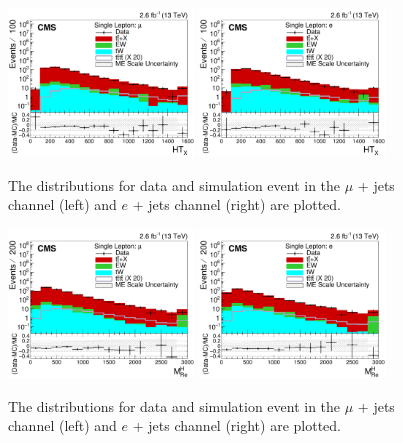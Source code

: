 \begin{figure}[ht!]
    \includegraphics[width=0.44\textwidth]{images/Run2/HTX_StackLogY.pdf}
    \includegraphics[width=0.44\textwidth]{images/Run2/HTX_StackLogY_e.pdf}
    \caption{ The \HTX distributions for data and simulation event in the $\mu$ + jets channel (left) and $e$ + jets channel (right) are plotted.}
    \label{fig:htx13}
\end{figure}

\begin{figure}[ht!]
    \includegraphics[width=0.44\textwidth]{images/Run2/SumJetMassX_StackLogY.pdf}
    \includegraphics[width=0.44\textwidth]{images/Run2/SumJetMassX_StackLogY_e.pdf}
    \caption{ The \redhadmass distributions for data and simulation event in the $\mu$ + jets channel (left) and $e$ + jets channel (right) are plotted.}
    \label{fig:sumjetmassx13}
\end{figure}


